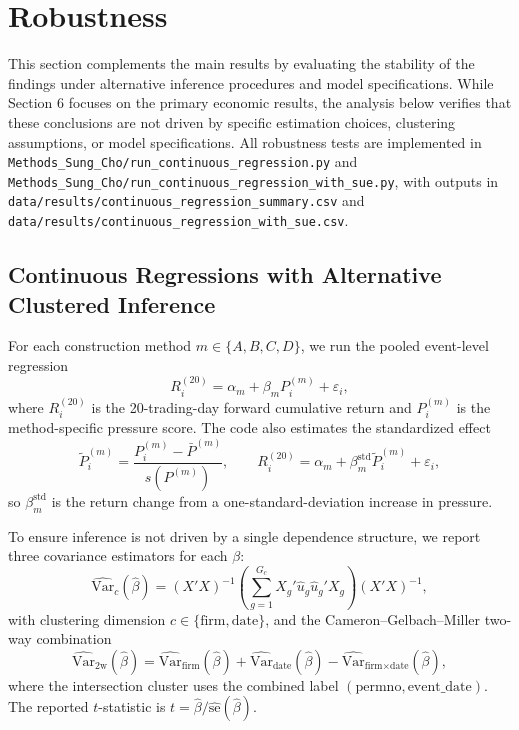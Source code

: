 \section{Robustness}

This section complements the main results by evaluating the stability of the findings under alternative inference procedures and model specifications. While Section 6 focuses on the primary economic results, the analysis below verifies that these conclusions are not driven by specific estimation choices, clustering assumptions, or model specifications. All robustness tests are implemented in
\texttt{Methods\_Sung\_Cho/run\_continuous\_regression.py} and
\texttt{Methods\_Sung\_Cho/run\_continuous\_regression\_with\_sue.py}, with
outputs in
\texttt{data/results/continuous\_regression\_summary.csv} and
\newline
\texttt{data/results/continuous\_regression\_with\_sue.csv}.

\subsection{Continuous Regressions with Alternative Clustered Inference}

For each construction method $m\in\{A,B,C,D\}$, we run the pooled event-level
regression
\begin{equation}
R^{(20)}_i = \alpha_m + \beta_m P^{(m)}_i + \varepsilon_i,
\label{eq:robust_baseline_raw}
\end{equation}
where $R^{(20)}_i$ is the 20-trading-day forward cumulative return and
$P^{(m)}_i$ is the method-specific pressure score. The code also estimates the
standardized effect
\begin{equation}
\widetilde P^{(m)}_i = \frac{P^{(m)}_i-\bar P^{(m)}}{s(P^{(m)})},
\qquad
R^{(20)}_i = \alpha_m + \beta^{\text{std}}_m\widetilde P^{(m)}_i + \varepsilon_i,
\label{eq:robust_baseline_std}
\end{equation}
so $\beta^{\text{std}}_m$ is the return change from a one-standard-deviation
increase in pressure.

To ensure inference is not driven by a single dependence structure, we report
three covariance estimators for each $\beta$:
\begin{equation}
\widehat{\mathrm{Var}}_c(\hat\beta)
=(X'X)^{-1}\left(\sum_{g=1}^{G_c} X_g'\hat u_g\hat u_g'X_g\right)(X'X)^{-1},
\end{equation}
with clustering dimension $c\in\{\text{firm},\text{date}\}$, and the
Cameron--Gelbach--Miller two-way combination
\begin{equation}
\widehat{\mathrm{Var}}_{2\mathrm{w}}(\hat\beta)
=\widehat{\mathrm{Var}}_{\text{firm}}(\hat\beta)
+\widehat{\mathrm{Var}}_{\text{date}}(\hat\beta)
-\widehat{\mathrm{Var}}_{\text{firm}\times\text{date}}(\hat\beta),
\label{eq:cgm_vcov}
\end{equation}
where the intersection cluster uses the combined label
$(\text{permno},\text{event\_date})$. The reported $t$-statistic is
$t=\hat\beta/\widehat{\mathrm{se}}(\hat\beta)$.

